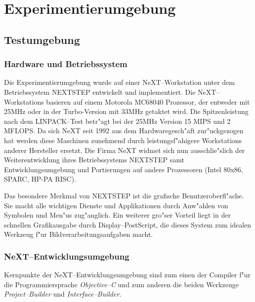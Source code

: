 \chapter{Experimentierumgebung}\label{Experimentierumgebung}

\section{Testumgebung}
\subsection*{Hardware und Betriebssystem}
Die Experimentierumgebung wurde auf einer NeXT--Workstation unter dem Betriebssystem
NEXTSTEP entwickelt und implementiert. Die NeXT--Workstations basieren auf
einem Motorola MC68040 Prozessor, der entweder mit 25MHz oder in der Turbo-Version mit
33MHz getaktet wird. Die Spitzenleistung nach dem LINPACK--Test betr"agt bei der 25MHz
Version 15 MIPS und 2 MFLOPS. Da sich NeXT seit 1992 aus dem Hardwaregesch"aft zur"uckgezogen
hat werden diese Maschinen zunehmend durch leistungsf"ahigere Workstations 
anderer Hersteller ersetzt. Die Firma NeXT widmet sich nun ausschlie"slich der Weiterentwicklung
ihres Betriebssystems NEXTSTEP samt Entwicklungsumgebung und Portierungen auf 
andere Prozessoren (Intel 80x86, SPARC, HP-PA RISC).

Das besondere Merkmal von NEXTSTEP ist die grafische Benutzeroberfl"ache. Sie macht alle
wichtigen Dienste und Applikationen durch Anw"ahlen von Symbolen und Men"us zug"anglich. Ein
weiterer gro"ser Vorteil liegt in der schnellen Grafikausgabe durch Display--PostScript, die
dieses System zum idealen Werkzeug f"ur Bild\-ver\-arbeit\-ungs\-auf\-gaben macht.

\subsection*{NeXT--Entwicklungsumgebung}
Kernpunkte der NeXT--Entwicklungsumgebung sind zum einen der Compiler f"ur die Programmiersprache
{\em Objective--C\/} und zum anderen die beiden Werkzeuge {\em Project--Builder\/} und 
{\em Interface--Builder\/}.

